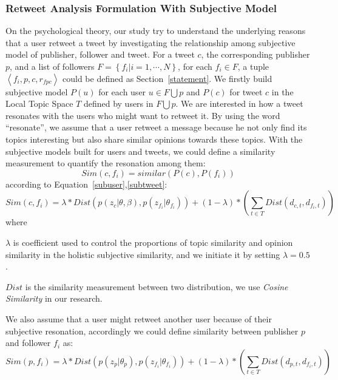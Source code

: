 \documentclass[preprint]{elsarticle}
\begin{document}
\subsubsection{Retweet Analysis Formulation With Subjective Model}
\label{formulation}
On the psychological theory, our study try to understand the underlying reasons that a user retweet a tweet by investigating the relationship among subjective model of publisher, follower and tweet. For a tweet $ c $, the corresponding publisher $ p $, and a list of followers $ F= \left\lbrace f_{i} \vert i=1, \cdots, N \right\rbrace  $, for each $ f_{i} \in F $, a tuple $ \left\langle f_{i}, p, c, r_{fpc} \right\rangle  $  could be defined as Section~\ref{statement}.
We firstly build subjective model $ P\left( u \right)  $ for each user $ u \in F \bigcup p $ and $ P\left( c \right)  $ for tweet $ c $ in the Local Topic Space $ T $ defined by users in $ F \bigcup p $. 
We are interested in how a tweet resonates with the users who might want to retweet it.
By using the word ``resonate'', we assume that a user retweet a message because he not only find its topics interesting but also share similar opinions towards these topics.
With the subjective models built for users and tweets, we could define a similarity measurement to quantify the resonation among them:\\
\begin{equation}
Sim\left( c,f_{i} \right) = similar\left( P\left( c \right), P\left( f_{i} \right) \right)
\end{equation}
according to Equation~\ref{subuser},\ref{subtweet}:
\begin{equation}
\label{tweetfollower}
Sim\left( c,f_{i} \right) = \lambda \ast Dist\left( p\left( z_{c} \vert \theta, \beta \right), p\left( z_{f_{i}} \vert \theta_{f_{i}} \right) \right) 
+\left(1-\lambda \right) \ast \left( \sum_{t \in T} Dist \left( d_{c,t}, d_{f_{i}, t} \right)  \right)
\end{equation}
where 
\begin{itemize*}
\item $ \lambda $ is coefficient used to control the proportions of topic similarity and opinion similarity in the holistic subjective similarity, and we initiate it by setting $ \lambda =0.5 $. 
\item $ Dist $ is the similarity measurement between two distribution, we use \emph{Cosine Similarity } in our research.
\end{itemize*}
We also assume that a user might retweet another user because of their subjective resonation, accordingly we could define similarity between publisher $ p $ and follower $ f_{i} $ as:
\begin{equation}
\label{pubfollower}
Sim\left( p,f_{i} \right) = \lambda \ast Dist\left( p\left( z_{p} \vert \theta_{p} \right), p\left( z_{f_{i}} \vert \theta_{f_{i}} \right) \right) 
+\left(1-\lambda \right) \ast \left( \sum_{t \in T} Dist \left( d_{p,t}, d_{f_{i}, t} \right)  \right)
\end{equation}
\end{document}
